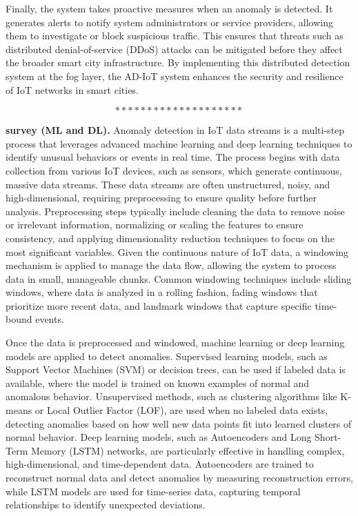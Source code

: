 Finally, the system takes proactive measures when an anomaly is detected. It generates alerts to notify system administrators or service providers, allowing them to investigate or block suspicious traffic. This ensures that threats such as distributed denial-of-service (DDoS) attacks can be mitigated before they affect the broader smart city infrastructure. By implementing this distributed detection system at the fog layer, the AD-IoT system enhances the security and resilience of IoT networks in smart cities\cite{78}.

$$********************$$

\textbf{survey (ML and DL).} Anomaly detection in IoT data streams is a multi-step process that leverages advanced machine learning and deep learning techniques to identify unusual behaviors or events in real time. The process begins with data collection from various IoT devices, such as sensors, which generate continuous, massive data streams. These data streams are often unstructured, noisy, and high-dimensional, requiring preprocessing to ensure quality before further analysis. Preprocessing steps typically include cleaning the data to remove noise or irrelevant information, normalizing or scaling the features to ensure consistency, and applying dimensionality reduction techniques to focus on the most significant variables. Given the continuous nature of IoT data, a windowing mechanism is applied to manage the data flow, allowing the system to process data in small, manageable chunks. Common windowing techniques include sliding windows, where data is analyzed in a rolling fashion, fading windows that prioritize more recent data, and landmark windows that capture specific time-bound events.

Once the data is preprocessed and windowed, machine learning or deep learning models are applied to detect anomalies. Supervised learning models, such as Support Vector Machines (SVM) or decision trees, can be used if labeled data is available, where the model is trained on known examples of normal and anomalous behavior. Unsupervised methods, such as clustering algorithms like K-means or Local Outlier Factor (LOF), are used when no labeled data exists, detecting anomalies based on how well new data points fit into learned clusters of normal behavior. Deep learning models, such as Autoencoders and Long Short-Term Memory (LSTM) networks, are particularly effective in handling complex, high-dimensional, and time-dependent data. Autoencoders are trained to reconstruct normal data and detect anomalies by measuring reconstruction errors, while LSTM models are used for time-series data, capturing temporal relationships to identify unexpected deviations.

